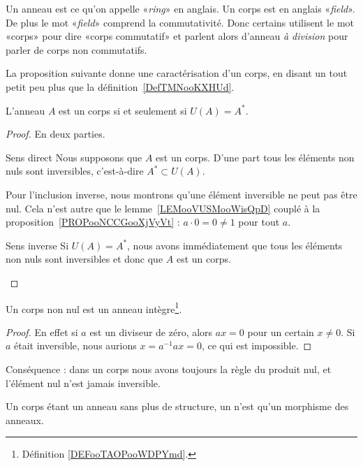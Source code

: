 \begin{remark}      \label{REMooYRNUooYgBBKF}
    Un anneau est ce qu'on appelle «\emph{ring}» en anglais. Un corps est en anglais «\emph{field}». De plus le mot «\emph{field}» comprend la commutativité. Donc certains utilisent le mot «corps» pour dire «corps commutatif» et parlent alors d'anneau \emph{à division} pour parler de corps non commutatifs.
\end{remark}

La proposition suivante donne une caractérisation d'un corps, en disant un tout petit peu plus que la définition~\ref{DefTMNooKXHUd}.
\begin{proposition}
    L'anneau $A$ est un corps si et seulement si \( U(A) = A^* \).
\end{proposition}

\begin{proof}
    En deux parties.
    \begin{subproof}
        \item[Sens direct]
            Nous supposons que \( A\) est un corps. D'une part tous les éléments non nuls sont inversibles, c'est-à-dire \( A^*\subset U(A)\).
            
            Pour l'inclusion inverse, nous montrons qu'une élément inversible ne peut pas être nul. Cela n'est autre que le lemme~\ref{LEMooVUSMooWisQpD} couplé à la proposition~\ref{PROPooNCCGooXjVyVt} : \( a\cdot 0=0\neq 1\) pour tout \( a\).
        \item[Sens inverse]
            Si \( U(A)=A^*\), nous avons immédiatement que tous les éléments non nuls sont inversibles et donc que \( A\) est un corps.
    \end{subproof}
\end{proof}

\begin{lemma}       \label{LemAnnCorpsnonInterdivzer}
    Un corps non nul est un anneau intègre\footnote{Définition \ref{DEFooTAOPooWDPYmd}.}.
\end{lemma}

\begin{proof}
    En effet si \( a\) est un diviseur de zéro, alors \( ax=0\) pour un certain \( x\neq 0\). Si \( a\) était inversible, nous aurions \( x=a^{-1}ax=0\), ce qui est impossible.
\end{proof}
Conséquence : dans un corps nous avons toujours la règle du produit nul, et l'élément nul n'est jamais inversible.

\begin{definition}
    Un corps étant un anneau sans plus de structure, un  n'est qu'un morphisme des anneaux.
\end{definition}

